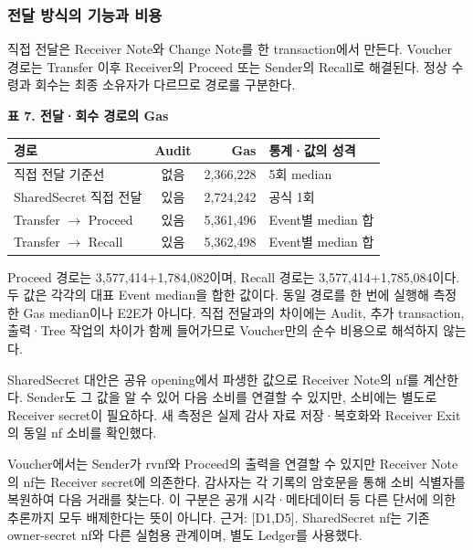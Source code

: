 \subsubsection*{전달 방식의 기능과 비용}
직접 전달은 Receiver Note와 Change Note를 한 transaction에서 만든다.
Voucher 경로는 Transfer 이후 Receiver의 Proceed 또는 Sender의 Recall로 해결된다.
정상 수령과 회수는 최종 소유자가 다르므로 경로를 구분한다.
\begin{center}\small\setlength{\tabcolsep}{6pt}
    \textbf{표 7. 전달·회수 경로의 Gas}\par\smallskip
    \begin{tabular}{@{}lcrl@{}}\toprule
        \textbf{경로}            & \textbf{Audit} & \textbf{Gas} & \textbf{통계·값의 성격} \\ \midrule
        직접 전달 기준선              & 없음             & 2,366,228    & 5회 median         \\
        SharedSecret 직접 전달     & 있음             & 2,724,242    & 공식 1회             \\
        Transfer $\to$ Proceed & 있음             & 5,361,496    & Event별 median 합   \\
        Transfer $\to$ Recall  & 있음             & 5,362,498    & Event별 median 합   \\
        \bottomrule\end{tabular}\end{center}

Proceed 경로는 3,577,414+1,784,082이며, Recall 경로는 3,577,414+1,785,084이다.
두 값은 각각의 대표 Event median을 합한 값이다. 동일 경로를 한 번에 실행해 측정한 Gas median이나 E2E가 아니다.
직접 전달과의 차이에는 Audit, 추가 transaction, 출력·Tree 작업의 차이가 함께 들어가므로 Voucher만의 순수 비용으로 해석하지 않는다.

SharedSecret 대안은 공유 opening에서 파생한 값으로 Receiver Note의 nf를 계산한다.
Sender도 그 값을 알 수 있어 다음 소비를 연결할 수 있지만, 소비에는 별도로 Receiver secret이 필요하다.
새 측정은 실제 감사 자료 저장·복호화와 Receiver Exit의 동일 nf 소비를 확인했다.

Voucher에서는 Sender가 rvnf와 Proceed의 출력을 연결할 수 있지만 Receiver Note의 nf는 Receiver secret에 의존한다.
감사자는 각 기록의 암호문을 통해 소비 식별자를 복원하여 다음 거래를 찾는다.
이 구분은 공개 시각·메타데이터 등 다른 단서에 의한 추론까지 모두 배제한다는 뜻이 아니다.
    {\small 근거: [D1,D5]. SharedSecret nf는 기존 owner-secret nf와 다른 실험용 관계이며, 별도 Ledger를 사용했다.}\par

